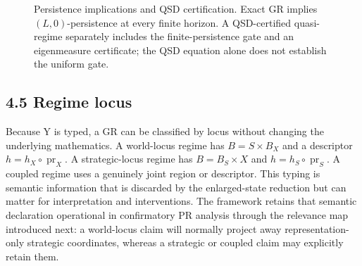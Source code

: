 \documentclass[10pt]{article}
\begin{document}
\begin{figure}[htbp]
\centering
{}
\caption{Persistence implications and QSD certification. Exact GR implies $(L,0)$-persistence at every finite horizon. A QSD-certified quasi-regime separately includes the finite-persistence gate and an eigenmeasure certificate; the QSD equation alone does not establish the uniform gate.}
\label{fig:persistence-hierarchy}
\end{figure}

\subsection{4.5 Regime locus}\label{regime-locus}

Because Y is typed, a GR can be classified by locus without changing the
underlying mathematics. A world-locus regime has \(B=S\times{}B_X\) and
a descriptor \(h=h_X\circ{}\operatorname{pr}_X\). A strategic-locus
regime has \(B=B_S\times{}X\) and \(h=h_S\circ{}\operatorname{pr}_S\). A
coupled regime uses a genuinely joint region or descriptor. This typing
is semantic information that is discarded by the enlarged-state
reduction but can matter for interpretation and interventions. The framework retains that semantic declaration operational in confirmatory PR
analysis through the relevance map introduced next: a world-locus claim
will normally project away representation-only strategic coordinates,
whereas a strategic or coupled claim may explicitly retain them.
\end{document}

